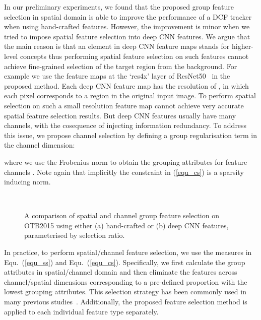 \documentclass[10pt,twocolumn,letterpaper]{article}
\begin{document}
In our preliminary experiments, we found that the proposed group feature selection in spatial domain is able to improve the performance of a DCF tracker when using hand-crafted features. 
However, the improvement is minor when we tried to impose spatial feature selection into deep CNN features.
We argue that the main reason is that an element in deep CNN feature maps stands for higher-level concepts thus performing spatial feature selection on such features cannot achieve fine-grained selection of the target region from the background.
For example we use the feature maps at the `res4x' layer of ResNet50~\cite{he2016deep} in the proposed method.
Each deep CNN feature map has the resolution of , in which each pixel corresponds to a  region in the original input image.
To perform spatial selection on such a small resolution feature map cannot achieve very accurate spatial feature selection results.
But deep CNN features usually have many channels, with the cosequence of injecting information redundancy.
To address this issue, we propose channel selection by defining a group regularisation term in the channel dimension:

where we use the Frobenius norm to obtain the grouping attributes for feature channels . Note again that implicitly the constraint in (\ref{equ_cs}) is a sparsity inducing  norm.
\begin{figure}[!t]
\centering
{}\\
\caption{A comparison of spatial and channel group feature selection on OTB2015 using either (a) hand-crafted or (b) deep CNN features, parameterised by selection ratio.}
\label{Impact_of_cs}
\end{figure}

In practice, to perform spatial/channel feature selection, we use the measures in Equ.~(\ref{equ_ss}) and Equ.~(\ref{equ_cs}).
Specifically, we first calculate the group attributes in spatial/channel domain and then eliminate the features across channel/spatial dimensions corresponding to a pre-defined proportion with the lowest grouping attributes.
This selection strategy has been commonly used in many previous studies~\cite{xu2011two,peng2015robust,song2018dictionary}.
Additionally, the proposed feature selection method is applied to each individual feature type separately.
\end{document}
